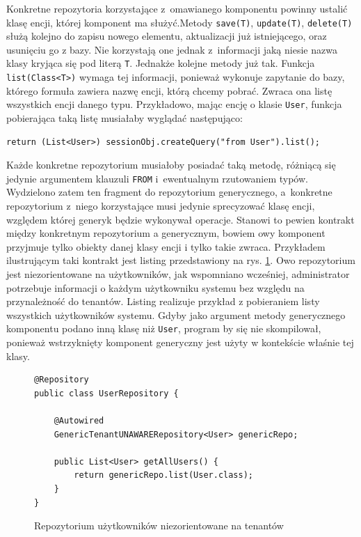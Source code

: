 \documentclass[a4paper]{book}
\begin{document}
{Konkretne repozytoria korzystające z~omawianego komponentu powinny ustalić klasę encji, której komponent ma służyć.Metody \lstinline|save(T)|, \lstinline|update(T)|, \lstinline|delete(T)| służą kolejno do zapisu nowego elementu, aktualizacji już istniejącego, oraz usunięciu go z bazy. Nie korzystają one jednak z~informacji jaką niesie nazwa klasy kryjąca się pod literą \lstinline|T|. Jednakże kolejne metody już tak. Funkcja \lstinline|list(Class<T>)| wymaga tej informacji, ponieważ wykonuje zapytanie do bazy, którego formuła zawiera nazwę encji, którą chcemy pobrać. Zwraca ona listę wszystkich encji danego typu. Przykładowo, mając encję o klasie \lstinline|User|, funkcja pobierająca taką listę musiałaby wyglądać następująco:
\begin{lstlisting}
return (List<User>) sessionObj.createQuery("from User").list();
\end{lstlisting}
Każde konkretne repozytorium musiałoby posiadać taką metodę, różniącą się jedynie argumentem klauzuli \lstinline|FROM| i~ewentualnym rzutowaniem typów. Wydzielono zatem ten fragment do repozytorium generycznego, a~konkretne repozytorium z~niego korzystające musi jedynie sprecyzować klasę encji, względem której generyk będzie wykonywał operacje. Stanowi to pewien kontrakt między konkretnym repozytorium a generycznym, bowiem owy komponent przyjmuje tylko obiekty danej klasy encji i tylko takie zwraca. Przykładem ilustrującym taki kontrakt jest listing przedstawiony na rys. \ref{id:fig:listing:UserUnawareRepository}. Owo repozytorium jest niezorientowane na użytkowników, jak wspomniano wcześniej, administrator potrzebuje informacji o każdym użytkowniku systemu bez względu na przynależność do tenantów. Listing realizuje przykład z pobieraniem listy wszystkich użytkowników systemu. Gdyby jako argument metody generycznego komponentu podano inną klasę niż \lstinline|User|, program by się nie skompilował, ponieważ wstrzyknięty komponent generyczny jest użyty w kontekście właśnie tej klasy.
\begin{figure}
\begin{lstlisting}
@Repository
public class UserRepository {
	
	@Autowired
	GenericTenantUNAWARERepository<User> genericRepo;
	
	public List<User> getAllUsers() {
		return genericRepo.list(User.class);
	}
}
\end{lstlisting}
\caption{Repozytorium użytkowników niezorientowane na tenantów}
\label{id:fig:listing:UserUnawareRepository}
\end{figure}

}
\end{document}
